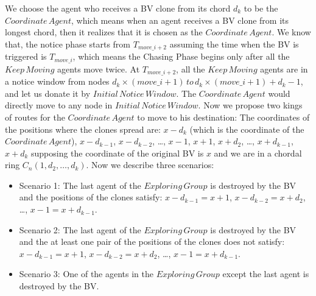 
We choose the agent who receives a BV clone from its chord $d_k$ to be the $Coordinate\,Agent$, which means when an agent receives a BV clone from its longest chord, then it realizes that it is chosen as the $Coordinate\, Agent$. We know that, the notice phase starts from $T_{move\_{i+2}}$ assuming the time when the BV is triggered is $T_{move\_i}$, which means the Chasing Phase begins only after all the $Keep\,Moving$ agents move twice. At $T_{move\_{i+2}}$, all the $Keep\,Moving$ agents are in a notice window from nodes $d_k\times(move\_{i}+1)\,to\,d_k\times(move\_{i}+1) + d_{k}-1$, and let us donate it by $Initial\,Notice\,Window$. The $Coordinate\,Agent$ would directly move to any node in $Initial\,Notice\,Window$. Now we propose two kings of routes for the $Coordinate\,Agent$ to move to his destination:
The coordinates of the positions where the clones spread are: $x-d_k$ (which is the coordinate of the $Coordinate\,Agent$), $x-d_{k-1}$, $x-d_{k-2}$, \ldots, $x-1$, $x+1$, $x+d_2$, \ldots, $x+d_{k-1}$, $x+d_{k}$ supposing the coordinate of the original BV is $x$ and we are in a chordal ring $C_n(1, d_2,\ldots, d_k)$.
 Now we describe three scenarios:
\begin{itemize}
\item Scenario 1: The last agent of the $Exploring\,Group$ is destroyed by the BV and the positions of the clones satisfy: $x-d_{k-1}=x+1$, $x-d_{k-2}=x+d_2$, \ldots, $x-1=x+d_{k-1}$. 
\item Scenario 2: The last agent of the $Exploring\,Group$ is destroyed by the BV and the at least one pair of the positions of the clones does not satisfy: $x-d_{k-1}=x+1$, $x-d_{k-2}=x+d_2$, \ldots, $x-1=x+d_{k-1}$. 
\item Scenario 3: One of the agents in the $Exploring\,Group$ except the last agent is destroyed by the BV.
\end{itemize}

